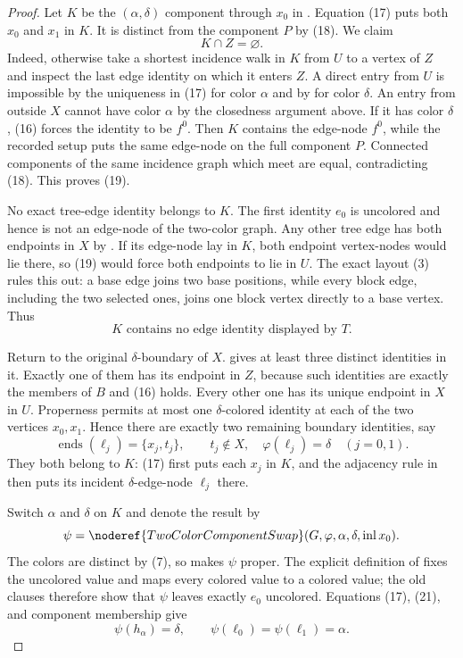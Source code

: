 \begin{proof}
Let $K$ be the $(\alpha,\delta)$ component through $x_0$ in
.  Equation (17) puts both $x_0$ and $x_1$
in $K$.  It is distinct from the component $P$ by (18).  We claim
\[
 K\cap Z=\varnothing.                                        \tag{19}
\]
Indeed, otherwise take a shortest incidence walk in $K$ from $U$ to a
vertex of $Z$ and inspect the last edge identity on which it enters $Z$.
A direct entry from $U$ is impossible by the uniqueness in (17) for
color $\alpha$ and by  for color
$\delta$.  An entry from outside $X$ cannot have color $\alpha$ by the
closedness argument above.  If it has color $\delta$, (16) forces the
identity to be $f^0$.  Then $K$ contains the edge-node $f^0$, while the
recorded setup puts the same edge-node on the full component $P$.
Connected components of the same incidence graph which meet are equal,
contradicting (18).  This proves (19).

No exact tree-edge identity belongs to $K$.  The first identity $e_0$ is
uncolored and hence is not an edge-node of the two-color graph.  Any
other tree edge has both endpoints in $X$ by
.  If its edge-node lay in $K$, both endpoint
vertex-nodes would lie there, so (19) would force both endpoints to lie
in $U$.  The exact layout (3) rules this out: a base edge joins two base
positions, while every block edge, including the two selected ones,
joins one block vertex directly to a base vertex.  Thus
\[
 K\text{ contains no edge identity displayed by }T.          \tag{20}
\]

Return to the original $\delta$-boundary of $X$.
 gives at least three distinct
identities in it.  Exactly one of them has its endpoint in $Z$, because
such identities are exactly the members of $B$ and (16) holds.  Every
other one has its unique endpoint in $X$ in $U$.  Properness permits at
most one $\delta$-colored identity at each of the two vertices $x_0,x_1$.
Hence there are exactly two remaining boundary identities, say
\[
 \operatorname{ends}(\ell_j)=\{x_j,t_j\},\qquad
 t_j\notin X,\quad \varphi(\ell_j)=\delta
 \quad(j=0,1).                                               \tag{21}
\]
They both belong to $K$: (17) first puts each $x_j$ in $K$, and the
adjacency rule in  then puts its incident
$\delta$-edge-node $\ell_j$ there.

Switch $\alpha$ and $\delta$ on $K$ and denote the result by
\[
 \psi=\noderef{TwoColorComponentSwap}
   (G,\varphi,\alpha,\delta,\operatorname{inl}x_0).
\]
The colors are distinct by (7), so
 makes $\psi$ proper.  The explicit
definition of  fixes the uncolored value
and maps every colored value to a colored value; the old
 clauses therefore show that $\psi$ leaves
exactly $e_0$ uncolored.  Equations (17), (21), and component membership
give
\[
 \psi(h_\alpha)=\delta,\qquad
 \psi(\ell_0)=\psi(\ell_1)=\alpha.                           \tag{22}
\]


\end{proof}
